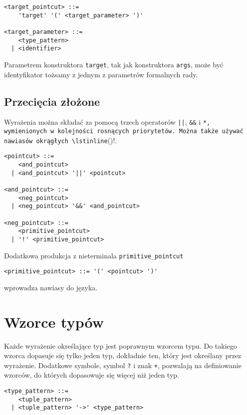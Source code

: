 \documentclass[a4paper,12pt]{mwbk}
\begin{document}
\begin{lstlisting}[style=grammar]
<target_pointcut> ::=
    'target' '(' <target_parameter> ')'

<target_parameter> ::=
    <type_pattern>
  | <identifier>
\end{lstlisting}

Parametrem konstruktora \lstinline!target!, tak jak konstruktora
\lstinline!args!, może być identyfikator tożsamy z jednym z parametrów
formalnych rady.

\subsection{Przecięcia złożone}

Wyrażenia można składać za pomocą trzech operatorów \lstinline!||!, \lstinline!&&! i 
\lstinline*!*, wymienionych w kolejności
rosnących priorytetów. Można także używać nawiasów okrągłych \lstinline!()!.

\begin{lstlisting}[style=grammar]
<pointcut> ::= 
    <and_pointcut> 
  | <and_pointcut> '||' <pointcut>

<and_pointcut> ::= 
    <neg_pointcut> 
  | <neg_pointcut> '&&' <and_pointcut>

<neg_pointcut> ::=
    <primitive_pointcut>
  | '!' <primitive_pointcut>
\end{lstlisting}

Dodatkowa produkcja z nieterminala \lstinline!primitive_pointcut!
\begin{lstlisting}[style=grammar]
<primitive_pointcut> ::= '(' <pointcut> ')'
\end{lstlisting}
wprowadza nawiasy do języka.




\section{Wzorce typów}\label{wzorce_typow}

Każde wyrażenie określające typ jest poprawnym wzorcem typu. Do takiego
wzorca dopasuje się tylko jeden typ, dokładnie ten, który jest określany
przez wyrażenie. Dodatkowe symbole, symbol \lstinline!?! i znak \lstinline!+!,
pozwalają na definiowanie wzorców, do których dopasowuje się więcej
niż jeden typ.

\begin{lstlisting}[style=grammar]
<type_pattern> ::=
    <tuple_pattern>
  | <tuple_pattern> '->' <type_pattern>
\end{lstlisting}
\end{document}
